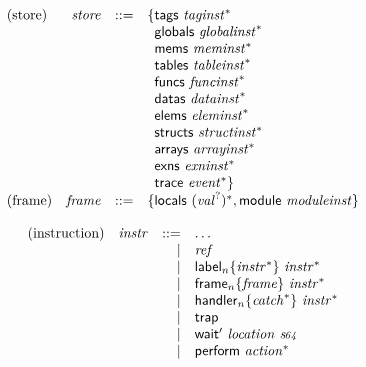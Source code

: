 \vspace{1ex}

$$
\begin{array}[t]{@{}lrrl@{}l@{}}
\mbox{(store)} & {\mathit{store}} & ::= & \{ \begin{array}[t]{@{}l@{}l@{}}
\mathsf{tags}~{{\mathit{taginst}}^\ast} \\
\mathsf{globals}~{{\mathit{globalinst}}^\ast} \\
\mathsf{mems}~{{\mathit{meminst}}^\ast} \\
\mathsf{tables}~{{\mathit{tableinst}}^\ast} \\
\mathsf{funcs}~{{\mathit{funcinst}}^\ast} \\
\mathsf{datas}~{{\mathit{datainst}}^\ast} \\
\mathsf{elems}~{{\mathit{eleminst}}^\ast} \\
\mathsf{structs}~{{\mathit{structinst}}^\ast} \\
\mathsf{arrays}~{{\mathit{arrayinst}}^\ast} \\
\mathsf{exns}~{{\mathit{exninst}}^\ast} \\
\mathsf{trace}~{{\mathit{event}}^\ast} \} \\
\end{array} \\
\mbox{(frame)} & {\mathit{frame}} & ::= & \{ \begin{array}[t]{@{}l@{}l@{}}
\mathsf{locals}~{({{\mathit{val}}^?})^\ast} ,  \mathsf{module}~{\mathit{moduleinst}} \} \\
\end{array} \\
\end{array}
$$

\vspace{1ex}

$$
\begin{array}[t]{@{}lrrl@{}l@{}}
\mbox{(instruction)} & {\mathit{instr}} & ::= & \dots \\
& & | & {\mathit{ref}} \\
& & | & {{\mathsf{label}}_{n}}{\{ {{\mathit{instr}}^\ast} \}}~{{\mathit{instr}}^\ast} \\
& & | & {{\mathsf{frame}}_{n}}{\{ {\mathit{frame}} \}}~{{\mathit{instr}}^\ast} \\
& & | & {{\mathsf{handler}}_{n}}{\{ {{\mathit{catch}}^\ast} \}}~{{\mathit{instr}}^\ast} \\
& & | & \mathsf{trap} \\
& & | & \mathsf{wait'}~{\mathit{location}}~{\mathit{s{\kern-0.1em\scriptstyle 64}}} \\
& & | & \mathsf{perform}~{{\mathit{action}}^\ast} \\
\end{array}
$$

